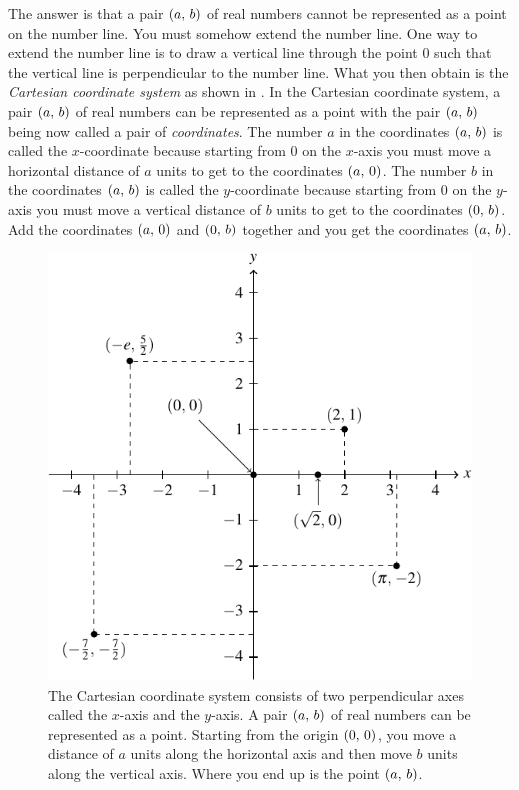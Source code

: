 \documentclass[a4paper,oneside,12pt]{article}
\begin{document}
The answer is that a pair $\left\lparen{a},\, {b}\right\rparen$ of real numbers cannot be
represented as a point on the number line.  You must somehow extend
the number line.  One way to extend the number line is to draw a
vertical line through the point $0$ such that the vertical line is
perpendicular to the number line.  What you then obtain is the
\emph{Cartesian coordinate system} as shown in
.  In the Cartesian coordinate
system, a pair $\left\lparen{a},\, {b}\right\rparen$ of real numbers can be represented as a
point with the pair $\left\lparen{a},\, {b}\right\rparen$ being now called a pair of
\emph{coordinates}.  The number $a$ in the coordinates $\left\lparen{a},\, {b}\right\rparen$
is called the $x$-coordinate because starting from $0$ on the
$x$-axis you must move a horizontal distance of $a$ units to get to
the coordinates $\left\lparen{a},\, {0}\right\rparen$.  The number $b$ in the coordinates
$\left\lparen{a},\, {b}\right\rparen$ is called the $y$-coordinate because starting from $0$
on the $y$-axis you must move a vertical distance of $b$ units to get
to the coordinates $\left\lparen{0},\, {b}\right\rparen$.  Add the coordinates $\left\lparen{a},\, {0}\right\rparen$
and $\left\lparen{0},\, {b}\right\rparen$ together and you get the coordinates
$\left\lparen{a},\, {b}\right\rparen$.

\begin{figure}[!htbp]
\centering
\includegraphics[scale=1.1]{image/03/cartesian-coordinate.pdf}
\caption{%
  The Cartesian coordinate system consists of two perpendicular axes
  called the $x$-axis and the $y$-axis.  A pair $\left\lparen{a},\, {b}\right\rparen$ of real
  numbers can be represented as a point.  Starting from the origin
  $\left\lparen{0},\, {0}\right\rparen$, you move a distance of $a$ units along the
  horizontal axis and then move $b$ units along the vertical axis.
  Where you end up is the point $\left\lparen{a},\, {b}\right\rparen$.
}
\label{fig:Cartesian_coordinate_system}
\end{figure}
\end{document}
